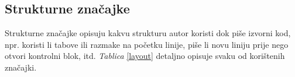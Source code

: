 \begin{table}[]
\end{table}

\subsection{Strukturne značajke}
Strukturne značajke opisuju kakvu strukturu autor koristi dok piše izvorni kod, npr. koristi li tabove ili razmake na početku linije, piše li novu liniju prije nego otvori kontrolni blok, itd. \textit{Tablica} \ref{layout} detaljno opisuje svaku od korištenih značajki.

